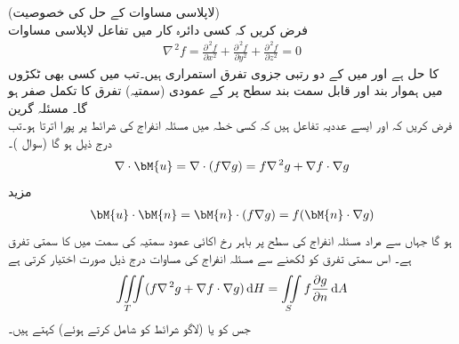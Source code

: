 \quad (لاپلاسی مساوات کے حل کی خصوصیت)\\
فرض کریں کہ کسی دائرہ کار  میں تفاعل  لاپلاسی مساوات
\begin{align*}
\nabla^{\,2}f=\frac{\partial^{\,2} f}{\partial x^2}+\frac{\partial^{\,2} f}{\partial y^2}+\frac{\partial^{\,2} f}{\partial z^2}=0
\end{align*}
کا حل ہے اور  میں  کے دو رتبی جزوی تفرق استمراری ہیں۔تب  میں کسی بھی ٹکڑوں میں ہموار  بند اور قابل سمت بند سطح  پر  کے عمودی  (سمتیہ) تفرق کا تکمل صفر ہو گا۔
\quad مسئلہ گرین\\
فرض کریں کہ  اور  ایسے عددیہ تفاعل ہیں کہ کسی خطہ  میں  مسئلہ انفراج کی شرائط پر پورا اترتا ہو۔تب درج ذیل ہو گا (سوال )۔
\begin{align*}
\nabla \cdot \bM{u}=\nabla \cdot(f\nabla g)=f\nabla^{\,2}g+\nabla f \cdot \nabla g
\end{align*}
مزید
\begin{align*}
\bM{u}\cdot \bM{n}=\bM{n}\cdot(f\nabla g)=f(\bM{n}\cdot \nabla g)
\end{align*}
ہو گا جہاں  سے مراد مسئلہ انفراج کی سطح  پر باہر رخ اکائی عمود سمتیہ  کی سمت میں  کا سمتی تفرق ہے۔ اس سمتی تفرق کو  لکھنے سے مسئلہ انفراج کی مساوات درج ذیل صورت اختیار کرتی ہے
\begin{align}\label{مساوات_خطی_تکمل_گرین_کلیہ_اول}
\iiint\limits_T (f\nabla^{\,2}g+\nabla f\cdot \nabla g)\dif H=\iint\limits_S f\frac{\partial g}{\partial n}\dif A
\end{align}
جس کو   یا (لاگو شرائط کو شامل کرتے ہوئے)  کہتے ہیں۔

